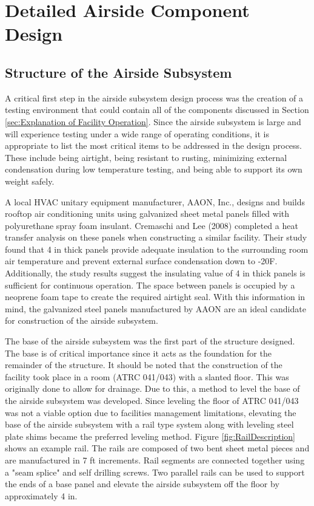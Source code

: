 \chapter{Detailed Airside Component Design}
\label{ch:Detailed Airside Component Design}

\section{Structure of the Airside Subsystem}
\label{sec:Structure of the Airside Subsystem}

A critical first step in the airside subsystem design process was the creation of a testing environment that could contain all of the components discussed in Section \ref{sec:Explanation of Facility Operation}. Since the airside subsystem is large and will experience testing under a wide range of operating conditions, it is appropriate to list the most critical items to be addressed in the design process. These include being airtight, being resistant to rusting, minimizing external condensation during low temperature testing, and being able to support its own weight safely.

A local HVAC unitary equipment manufacturer, AAON, Inc., designs and builds rooftop air conditioning units using galvanized sheet metal panels filled with polyurethane spray foam insulant. Cremaschi and Lee (2008) completed a heat transfer analysis on these panels when constructing a similar facility. Their study found that 4 in thick panels provide adequate insulation to the surrounding room air temperature and prevent external surface condensation down to -20\degree F. Additionally, the study results suggest the insulating value of 4 in thick panels is sufficient for continuous operation. The space between panels is occupied by a neoprene foam tape to create the required airtight seal. With this information in mind, the galvanized steel panels manufactured by AAON are an ideal candidate for construction of the airside subsystem.

The base of the airside subsystem was the first part of the structure designed. The base is of critical importance since it acts as the foundation for the remainder of the structure. It should be noted that the construction of the facility took place in a room (ATRC 041/043) with a slanted floor. This was originally done to allow for drainage. Due to this, a method to level the base of the airside subsystem was developed. Since leveling the floor of ATRC 041/043 was not a viable option due to facilities management limitations, elevating the base of the airside subsystem with a rail type system along with leveling steel plate shims became the preferred leveling method. Figure \ref{fig:RailDescription} shows an example rail. The rails are composed of two bent sheet metal pieces and are manufactured in 7 ft increments. Rail segments are connected together using a "seam splice" and self drilling screws. Two parallel rails can be used to support the ends of a base panel and elevate the airside subsystem off the floor by approximately 4 in.

